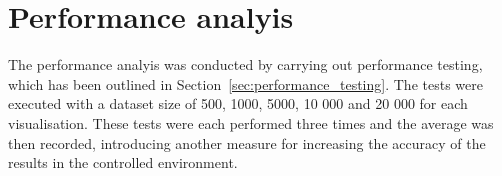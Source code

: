 \section{Performance analyis} {
\label{sec:performance_analysis}


	The performance analyis was conducted by carrying out performance testing, which has been outlined in Section~\ref{sec:performance_testing}. The tests were executed with a dataset size of 500, 1000, 5000, 10 000 and 20 000 for each visualisation. These tests were each performed three times and the average was then recorded, introducing another measure for increasing the accuracy of the results in the controlled environment.

}

